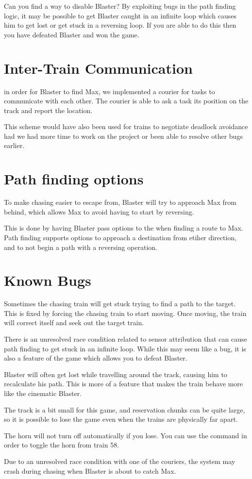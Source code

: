 \documentclass[pdftex,10pt,a4paper]{article}
\begin{document}
Can you find a way to disable Blaster? By exploiting bugs in the path
finding logic, it may be possible to get Blaster caught in an infinite
loop which causes him to get lost or get stuck in a reversing loop. If
you are able to do this then you have defeated Blaster and won the
game.

\section*{Inter-Train Communication}

in order for Blaster to find Max, we implemented a courier for
 tasks to communicate with each other. The courier is able
to ask a  task its position on the track and report the
location.

This scheme would have also been used for trains to negotiate deadlock
avoidance had we had more time to work on the project or been able to
resolve other bugs earlier.

\section*{Path finding options}

To make chasing easier to escape from, Blaster will try to approach
Max from behind, which allows Max to avoid having to start by
reversing.

This is done by having Blaster pass options to the
 when finding a route to Max. Path finding
supports options to approach a destination from etiher direction, and
to not begin a path with a reversing operation.

\section*{Known Bugs}

Sometimes the chasing train will get stuck trying to find a path to
the target. This is fixed by forcing the chasing train to start
moving. Once moving, the train will correct itself and seek out the
target train.

There is an unresolved race condition related to sensor attribution
that can cause path finding to get stuck in an infinite loop. While
this may seem like a bug, it is also a feature of the game which
allows you to defeat Blaster.

Blaster will often get lost while travelling around the track,
causing him to recalculate his path. This is more of a feature that
makes the train behave more like the cinematic Blaster.

The track is a bit small for this game, and reservation chunks can be
quite large, so it is possible to lose the game even when the trains
are physically far apart.

The horn will not turn off automatically if you lose. You can use the
command  in order to toggle the horn from train 58.

Due to an unresolved race condition with one of the couriers, the
system may crash during chasing when Blaster is about to catch Max.
\end{document}
